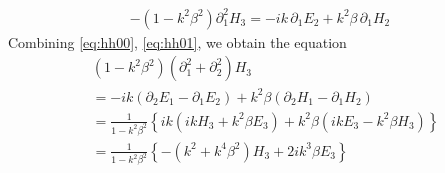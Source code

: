 \begin{align}\label{eq:hh01}
  -\left(1-k^2\beta^2\right)\partial_1^2 H_3 = -ik \,\partial_1 E_2 + k^2\beta\,\partial_1 H_2
\end{align}
Combining \eqref{eq:hh00}, \eqref{eq:hh01}, we obtain the equation
\begin{equation}
\begin{split}
  &\left(1-k^2\beta^2\right)\left(\partial_1^2 + \partial_2^2\right)H_3 \\
  &=-ik\left(\partial_2 E_1 - \partial_1 E_2\right) + k^2\beta\left(\partial_2 H_1 - \partial_1 H_2\right)\\
  &= \frac{1}{1-k^2\beta^2}\left\{ik\left(ik H_3 + k^2\beta E_3\right) + k^2\beta\left(ik E_3 - k^2\beta H_3\right)\right\} \\
  &= \frac{1}{1-k^2\beta^2}\left\{-\left(k^2 + k^4\beta^2\right)H_3 + 2 i k^3\beta E_3\right\} \\
\end{split}
\end{equation}

